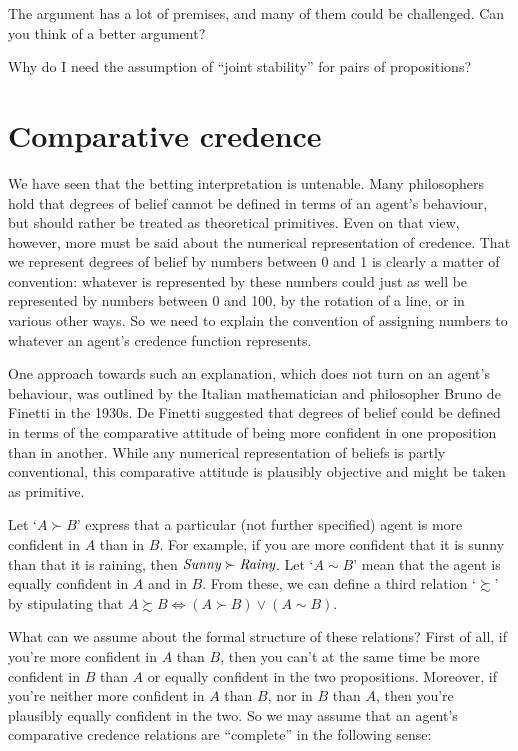 The argument has a lot of premises, and many of them could be
challenged. Can you think of a better argument?

\begin{exercise3}
  Why do I need the assumption of ``joint stability'' for pairs of
  propositions?
\end{exercise3}



\section{Comparative credence}\label{sec:comparative-credence}

We have seen that the betting interpretation is untenable. Many
philosophers hold that degrees of belief cannot be defined in terms of
an agent's behaviour, but should rather be treated as theoretical
primitives. Even on that view, however, more must be said about the
numerical representation of credence. That we represent degrees of
belief by numbers between 0 and 1 is clearly a matter of convention:
whatever is represented by these numbers could just as well be
represented by numbers between 0 and 100, by the rotation of a line,
or in various other ways. So we need to explain the convention of
assigning numbers to whatever an agent's credence function represents.

One approach towards such an explanation, which does not turn on an
agent's behaviour, was outlined by the Italian mathematician and
philosopher Bruno de Finetti in the 1930s. De Finetti suggested that
degrees of belief could be defined in terms of the comparative
attitude of being more confident in one proposition than in another.
While any numerical representation of beliefs is partly conventional,
this comparative attitude is plausibly objective and might be taken as
primitive.

Let `$A \succ B$' express that a particular (not further
specified) agent is more confident in $A$ than in $B$. For example, if
you are more confident that it is sunny than that it is raining, then
$\emph{Sunny} \succ \emph{Rainy}$. Let `$A \sim B$' mean that the
agent is equally confident in $A$ and in $B$. From these, we can
define a third relation `$\succsim$' by stipulating that
$A \succsim B \Leftrightarrow (A \succ B) \lor (A \sim B)$.

What can we assume about the formal structure of these relations?
First of all, if you're more confident in $A$ than $B$, then you can't
at the same time be more confident in $B$ than $A$ or equally
confident in the two propositions. Moreover, if you're neither more
confident in $A$ than $B$, nor in $B$ than $A$, then you're plausibly
equally confident in the two. So we may assume that an agent's
comparative credence relations are ``complete'' in the following
sense:

